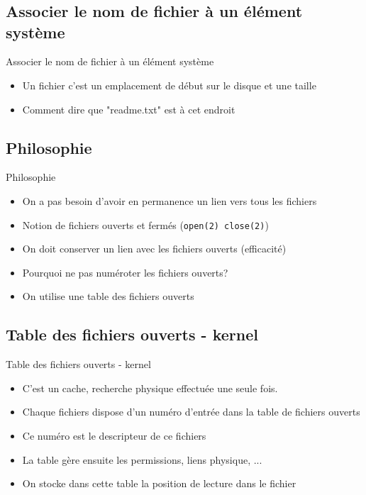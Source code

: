 \section{\sectitle}
\begin{frame}{\sectitle}
\def\subsectitle{Associer le nom de fichier à un élément système}
\subsection{\subsectitle}
\begin{block}{\subsectitle}
\begin{itemize}
    \item Un fichier c'est un emplacement de début sur le disque et une taille
    \item Comment dire que "readme.txt" est à cet endroit
\end{itemize}
\end{block}

\def\subsectitle{Philosophie}
\subsection{\subsectitle}
\begin{block}{\subsectitle}
\begin{itemize}
    \item On a pas besoin d'avoir en permanence un lien vers tous les fichiers
    \item Notion de fichiers ouverts et fermés (\texttt{open(2) close(2)})
    \item On doit conserver un lien avec les fichiers ouverts (efficacité)
    \item Pourquoi ne pas numéroter les fichiers ouverts?
    \item On utilise une table des fichiers ouverts
\end{itemize}
\end{block}

\end{frame}


\begin{frame}{\sectitle}
\def\subsectitle{Table des fichiers ouverts - kernel}
\subsection{\subsectitle}
\begin{block}{\subsectitle}
\begin{itemize}
    \item C'est un cache, recherche physique effectuée une seule fois.
    \item Chaque fichiers dispose d'un numéro d'entrée dans la table de fichiers
    ouverts
    \item Ce numéro est le descripteur de ce fichiers
    \item La table gère ensuite les permissions, liens physique, ...
    \item On stocke dans cette table la position de lecture dans le fichier
\end{itemize}
\end{block}
\end{frame}

